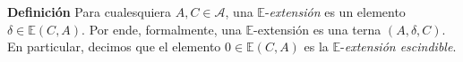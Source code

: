 \documentclass[preview]{standalone}
\begin{document}
\begin{center}
\justifying \textbf{Definición} Para cualesquiera $A,C\in\mathscr{A}$, una $\mathbb{E}$-\emph{extensión} es un elemento $\delta\in\mathbb{E}(C,A)$. Por ende, formalmente, una $\mathbb{E}$-extensión es una terna $(A,\delta,C)$. En particular, decimos que el elemento $0\in\mathbb{E}(C,A)$ es la $\mathbb{E}$-\emph{extensión escindible}.
\end{center}
\end{document}
